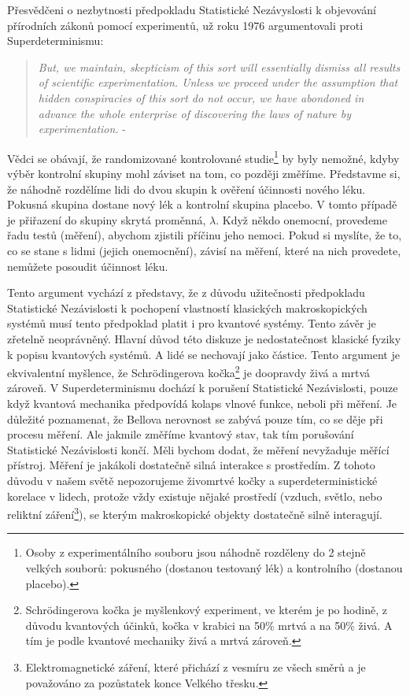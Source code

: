 Přesvědčeni o nezbytnosti předpokladu Statistické Nezávyslosti k objevování přírodních zákonů pomocí experimentů, \citeauthor{ArgSciMeth:1} už roku 1976 argumentovali proti Superdeterminismu:
\begin{quote}
    \emph{But, we maintain, skepticism of this sort will essentially dismiss all results of scientific experimentation. Unless we proceed under the assumption that hidden conspiracies of this sort do not occur, we have abondoned in advance the whole enterprise of discovering the laws of nature by experimentation.} - \cite{ArgSciMeth:1}
\end{quote}

Vědci se obávají, že randomizované kontrolované studie\footnote[14]{Osoby z experimentálního souboru jsou náhodně rozděleny do 2 stejně velkých souborů: pokusného (dostanou testovaný lék) a kontrolního (dostanou placebo).} by byly nemožné, kdyby výběr kontrolní skupiny mohl záviset na tom, co později změříme. Představme si, že náhodně rozdělíme lidi do dvou skupin k ověření účinnosti nového léku. Pokusná skupina dostane nový lék a kontrolní skupina placebo. V tomto případě je přiřazení do skupiny skrytá proměnná, $\lambda$. Když někdo onemocní, provedeme řadu testů (měření), abychom zjistili příčinu jeho nemoci. Pokud si myslíte, že to, co se stane s lidmi (jejich onemocnění), závisí na měření, které na nich provedete, nemůžete posoudit účinnost léku.

Tento argument vychází z představy, že z důvodu užitečnosti předpokladu Statistické Nezávislosti k pochopení vlastností klasických makroskopických systémů musí tento předpoklad platit i pro kvantové systémy. Tento závěr je zřetelně neoprávněný. Hlavní důvod této diskuze je nedostatečnost klasické fyziky k popisu kvantových systémů. A lidé se nechovají jako částice. Tento argument je ekvivalentní myšlence, že Schrödingerova kočka\footnote[15]{Schrödingerova kočka je myšlenkový experiment, ve kterém je po hodině, z důvodu kvantových účinků, kočka v krabici na 50\% mrtvá a na 50\% živá. A tím je podle kvantové mechaniky živá a mrtvá zároveň.} je doopravdy živá a mrtvá zároveň. V Superdeterminismu dochází k porušení Statistické Nezávislosti, pouze když kvantová mechanika předpovídá kolaps vlnové funkce, neboli při měření. Je důležité poznamenat, že Bellova nerovnost se zabývá pouze tím, co se děje při procesu měření. Ale jakmile změříme kvantový stav, tak tím porušování Statistické Nezávislosti končí. Měli bychom dodat, že měření nevyžaduje měřící přístroj. Měření je jakákoli dostatečně silná interakce s prostředím. Z tohoto důvodu v našem světě nepozorujeme živomrtvé kočky a superdeterministické korelace v lidech, protože vždy existuje nějaké prostředí (vzduch, světlo, nebo reliktní záření\footnote[16]{Elektromagnetické záření, které přichází z vesmíru ze všech směrů a je považováno za pozůstatek konce Velkého třesku.}), se kterým makroskopické objekty dostatečně silně interagují.